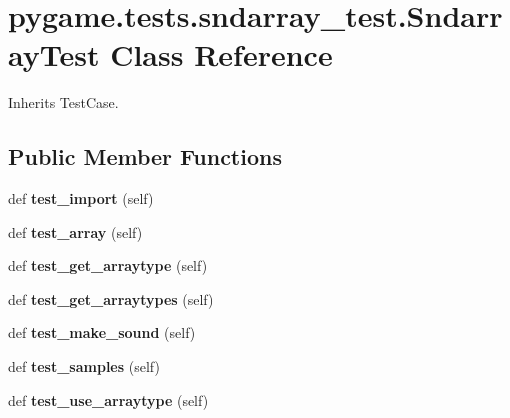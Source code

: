 \hypertarget{classpygame_1_1tests_1_1sndarray__test_1_1_sndarray_test}{}\section{pygame.\+tests.\+sndarray\+\_\+test.\+Sndarray\+Test Class Reference}
\label{classpygame_1_1tests_1_1sndarray__test_1_1_sndarray_test}


Inherits Test\+Case.

\subsection*{Public Member Functions}
\begin{DoxyCompactItemize}
\item 
\mbox{\label{classpygame_1_1tests_1_1sndarray__test_1_1_sndarray_test_a20ee2565895d5d0f923081808d2c1e3f}} 
def {\bfseries test\+\_\+import} (self)
\item 
\mbox{\label{classpygame_1_1tests_1_1sndarray__test_1_1_sndarray_test_a66bb8527a588e413eca85eb29006f436}} 
def {\bfseries test\+\_\+array} (self)
\item 
\mbox{\label{classpygame_1_1tests_1_1sndarray__test_1_1_sndarray_test_a0d0d49dd7cbf296d72be1b6e8fd7cbb5}} 
def {\bfseries test\+\_\+get\+\_\+arraytype} (self)
\item 
\mbox{\label{classpygame_1_1tests_1_1sndarray__test_1_1_sndarray_test_a6fa17497e0e28bc75d95a3c6c7a3b565}} 
def {\bfseries test\+\_\+get\+\_\+arraytypes} (self)
\item 
\mbox{\label{classpygame_1_1tests_1_1sndarray__test_1_1_sndarray_test_ac54134d15f9b5c377312027517e282d0}} 
def {\bfseries test\+\_\+make\+\_\+sound} (self)
\item 
\mbox{\label{classpygame_1_1tests_1_1sndarray__test_1_1_sndarray_test_a65a96bb184a13337a749afeaa112be1a}} 
def {\bfseries test\+\_\+samples} (self)
\item 
\mbox{\label{classpygame_1_1tests_1_1sndarray__test_1_1_sndarray_test_a4406cb645059d5bc01c6c4be227f9c36}} 
def {\bfseries test\+\_\+use\+\_\+arraytype} (self)
\end{DoxyCompactItemize}
